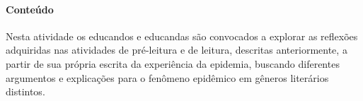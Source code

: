 \documentclass[12pt]{extarticle}
\begin{document}

\paragraph{Conteúdo}

Nesta atividade os educandos e educandas são convocados a explorar as
reflexões adquiridas nas atividades de pré-leitura e de leitura,
descritas anteriormente, a partir de sua própria escrita da experiência
da epidemia, buscando diferentes argumentos e explicações para o
fenômeno epidêmico em gêneros literários distintos.
\end{document}
